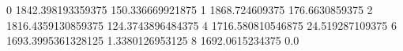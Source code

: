 0 1842.398193359375 150.336669921875
1 1868.724609375 176.6630859375
2 1816.4359130859375 124.3743896484375
4 1716.580810546875 24.519287109375
6 1693.3995361328125 1.3380126953125
8 1692.0615234375 0.0
